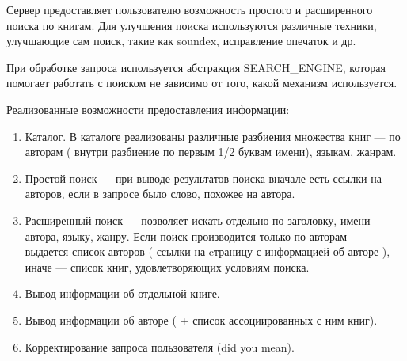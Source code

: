 Сервер предоставляет пользователю возможность простого и расширенного поиска по книгам. Для улучшения поиска используются различные техники, улучшающие сам поиск, такие как soundex, исправление опечаток и др. %

При обработке запроса используется абстракция SEARCH\_ENGINE, которая помогает работать с поиском не зависимо от того, какой механизм используется.

Реализованные возможности предоставления информации:
\begin{enumerate}
	\item Каталог. В каталоге реализованы различные разбиения множества книг --- по авторам ( внутри разбиение по первым 1/2 буквам имени), языкам, жанрам.
	\item Простой поиск --- при выводе результатов поиска вначале есть ссылки на авторов, если в запросе было слово, похожее на автора.
	\item Расширенный поиск --- позволяет искать отдельно по заголовку, имени автора, языку, жанру. Если поиск производится только по авторам --- выдается список авторов ( ссылки на cтраницу с информацией об авторе ), иначе --- список книг, удовлетворяющих условиям поиска.
\item Вывод информации об отдельной книге.
\item Вывод информации об авторе ( + список ассоциированных с ним книг).
\item Корректирование запроса пользователя (did you mean).
\end{enumerate}


\newpage